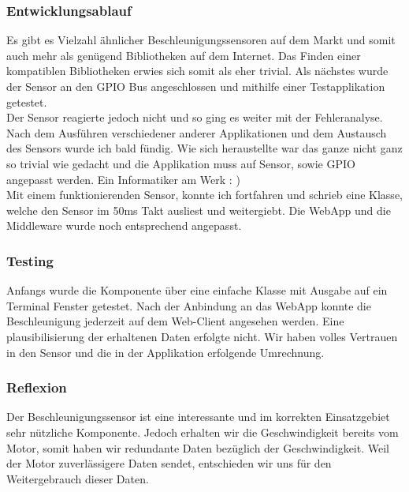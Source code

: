 \documentclass[../../main.tex]{subfiles}
\begin{document}
\subsubsection{Entwicklungsablauf}
Es gibt es Vielzahl ähnlicher Beschleunigungssensoren auf dem Markt und somit auch mehr als genügend Bibliotheken auf dem Internet. Das Finden einer kompatiblen Bibliotheken erwies sich somit als eher trivial. Als nächstes wurde der Sensor an den GPIO Bus angeschlossen und mithilfe einer Testapplikation getestet. \\
Der Sensor reagierte jedoch nicht und so ging es weiter mit der Fehleranalyse. Nach dem Ausführen verschiedener anderer Applikationen und dem Austausch des Sensors wurde ich bald fündig. Wie sich heraustellte war das ganze nicht ganz so trivial wie gedacht und die Applikation muss auf Sensor, sowie GPIO angepasst werden. Ein Informatiker am Werk : )\\
Mit einem funktionierenden Sensor, konnte ich fortfahren und schrieb eine Klasse, welche den Sensor im 50ms Takt ausliest und weitergiebt. Die WebApp und die Middleware wurde noch entsprechend angepasst.\\

\subsubsection{Testing}
Anfangs wurde die Komponente über eine einfache Klasse mit Ausgabe auf ein Terminal Fenster getestet. Nach der Anbindung an das WebApp konnte die Beschleunigung jederzeit auf dem Web-Client angesehen werden. Eine plausibilisierung der erhaltenen Daten erfolgte nicht. Wir haben volles Vertrauen in den Sensor und die in der Applikation erfolgende Umrechnung.

\subsubsection{Reflexion}
Der Beschleunigungssensor ist eine interessante und im korrekten Einsatzgebiet sehr nützliche Komponente. Jedoch erhalten wir die Geschwindigkeit bereits vom Motor, somit haben wir redundante Daten bezüglich der Geschwindigkeit. Weil der Motor zuverlässigere Daten sendet, entschieden wir uns für den Weitergebrauch dieser Daten.
\end{document}
